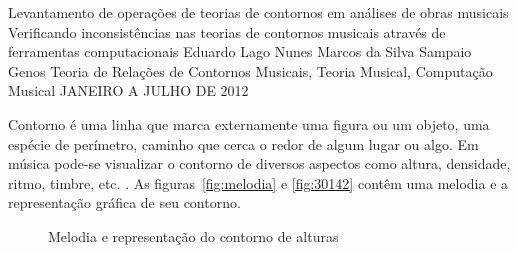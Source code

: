 \documentclass[11pt]{article}
\begin{document}
\graphicspath{{figs/}}


\dadosRelatorioFinal
{Levantamento de operações de teorias de contornos em análises de
  obras musicais}
{Verificando inconsistências nas teorias de contornos musicais através
  de ferramentas computacionais }
{Eduardo Lago Nunes}
{Marcos da Silva Sampaio}
{Genos}
{Teoria de Relações de Contornos Musicais, Teoria Musical, Computação Musical}
{JANEIRO A JULHO DE 2012}


\newpage

\setcounter{page}{1}
\onehalfspace

\label{sec:introducao}

Contorno é uma linha que marca externamente uma figura ou um objeto,
uma espécie de perímetro, caminho que cerca o redor de algum lugar ou
algo. Em música pode-se visualizar o contorno de diversos aspectos
como altura, densidade, ritmo, timbre, etc.
\cite[p. 01]{Sampaio2008}.
As figuras~\ref{fig:melodia} e \ref{fig:30142} contêm uma melodia e a
representação gráfica de seu contorno.

\begin{figure}
  \centering
  \caption{Melodia e representação do contorno de alturas}
  \label{fig:melodia-representacao}
\end{figure}
\end{document}
